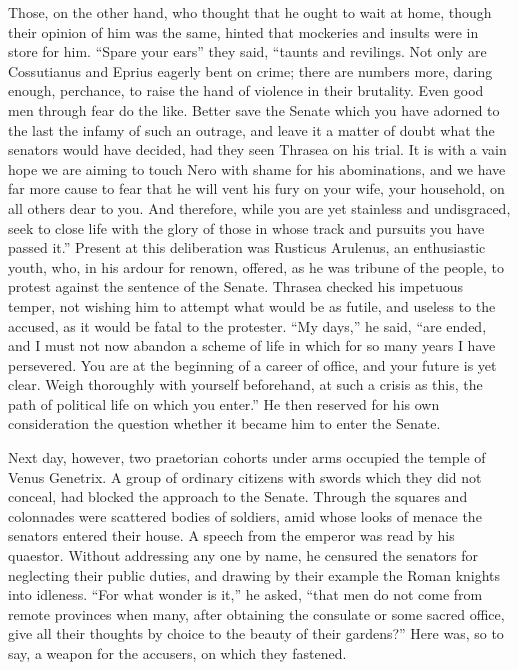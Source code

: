 Those, on the other hand, who thought that he ought to wait at home, though their opinion of him was the same, hinted that mockeries and insults were in store for him. ``Spare your ears'' they said, ``taunts and revilings. Not only are Cossutianus and Eprius eagerly bent on crime; there are numbers more, daring enough, perchance, to raise the hand of violence in their brutality. Even good men through fear do the like. Better save the Senate which you have adorned to the last the infamy of such an outrage, and leave it a matter of doubt what the senators would have decided, had they seen Thrasea on his trial. It is with a vain hope we are aiming to touch Nero with shame for his abominations, and we have far more cause to fear that he will vent his fury on your wife, your household, on all others dear to you. And therefore, while you are yet stainless and undisgraced, seek to close life with the glory of those in whose track and pursuits you have passed it.'' Present at this deliberation was Rusticus Arulenus, an enthusiastic youth, who, in his ardour for renown, offered, as he was tribune of the people, to protest against the sentence of the Senate. Thrasea checked his impetuous temper, not wishing him to attempt what would be as futile, and useless to the accused, as it would be fatal to the protester. ``My days,'' he said, ``are ended, and I must not now abandon a scheme of life in which for so many years I have persevered. You are at the beginning of a career of office, and your future is yet clear. Weigh thoroughly with yourself beforehand, at such a crisis as this, the path of political life on which you enter.'' He then reserved for his own consideration the question whether it became him to enter the Senate.


Next day, however, two praetorian cohorts under arms occupied the temple of Venus Genetrix. A group of ordinary citizens with swords which they did not conceal, had blocked the approach to the Senate. Through the squares and colonnades were scattered bodies of soldiers, amid whose looks of menace the senators entered their house. A speech from the emperor was read by his quaestor. Without addressing any one by name, he censured the senators for neglecting their public duties, and drawing by their example the Roman knights into idleness. ``For what wonder is it,'' he asked, ``that men do not come from remote provinces when many, after obtaining the consulate or some sacred office, give all their thoughts by choice to the beauty of their gardens?'' Here was, so to say, a weapon for the accusers, on which they fastened.

